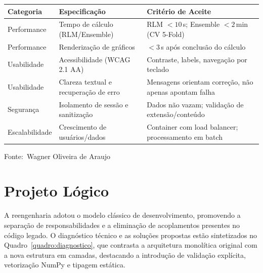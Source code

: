 \documentclass[12pt,a4paper]{article}
\newcommand{\oautor}{Wagner Oliveira de Araujo}
\begin{document}
\begin{quadro}[ht]
\centering
\small
\caption{Especificação de requisitos não funcionais}
\label{quadro:nao-funcionais}
\begin{threeparttable}
\begin{tabularx}{\textwidth}{|l|X|X|} \hline
\textbf{Categoria} & \textbf{Especificação} & \textbf{Critério de Aceite} \\ \hline
Performance & Tempo de cálculo (RLM/Ensemble) & RLM $< 10\,$s; Ensemble $< 2\,$min (CV 5-Fold) \\ \hline
Performance & Renderização de gráficos & $< 3\,$s após conclusão do cálculo \\ \hline
Usabilidade & Acessibilidade (WCAG 2.1 AA) & Contraste, labels, navegação por teclado \\ \hline
Usabilidade & Clareza textual e recuperação de erro & Mensagens orientam correção, não apenas apontam falha \\ \hline
Segurança & Isolamento de sessão e sanitização & Dados não vazam; validação de extensão/conteúdo \\ \hline
Escalabilidade & Crescimento de usuários/dados & Container com load balancer; processamento em batch \\ \hline
\end{tabularx}
\begin{tablenotes}[flushleft]
\footnotesize
\item Fonte:~\oautor
\end{tablenotes}
\end{threeparttable}
\end{quadro}

\newpage
\section{Projeto Lógico}

A reengenharia adotou o modelo clássico de desenvolvimento, promovendo a separação de responsabilidades e a eliminação de acoplamentos presentes no código legado. O diagnóstico técnico e as soluções propostas estão sintetizados no Quadro~\ref{quadro:diagnostico}, que contrasta a arquitetura monolítica original com a nova estrutura em camadas, destacando a introdução de validação explícita, vetorização NumPy e tipagem estática.
\end{document}
